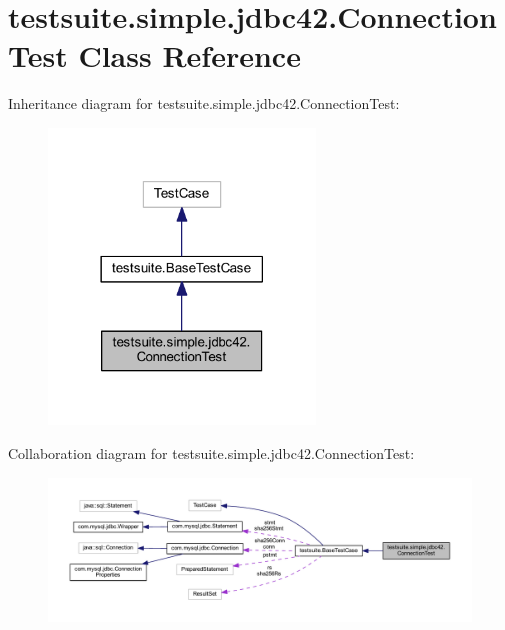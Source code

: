 \hypertarget{classtestsuite_1_1simple_1_1jdbc42_1_1_connection_test}{}\section{testsuite.\+simple.\+jdbc42.\+Connection\+Test Class Reference}
\label{classtestsuite_1_1simple_1_1jdbc42_1_1_connection_test}


Inheritance diagram for testsuite.\+simple.\+jdbc42.\+Connection\+Test\+:
\nopagebreak
\begin{figure}[H]
\begin{center}
\leavevmode
\includegraphics[width=201pt]{classtestsuite_1_1simple_1_1jdbc42_1_1_connection_test__inherit__graph}
\end{center}
\end{figure}


Collaboration diagram for testsuite.\+simple.\+jdbc42.\+Connection\+Test\+:
\nopagebreak
\begin{figure}[H]
\begin{center}
\leavevmode
\includegraphics[width=350pt]{classtestsuite_1_1simple_1_1jdbc42_1_1_connection_test__coll__graph}
\end{center}
\end{figure}
